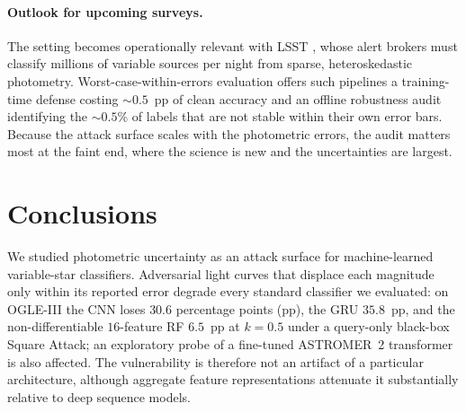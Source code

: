 \documentclass{aa}
\begin{document}
\paragraph{Outlook for upcoming surveys.}
The setting becomes operationally relevant with LSST \citep{ivezic2019lsst}, whose alert brokers must classify millions of
variable sources per night from sparse, heteroskedastic photometry.
Worst-case-within-errors evaluation offers such pipelines a training-time
defense costing ${\sim}0.5$~pp of clean accuracy and an offline robustness
audit identifying the ${\sim}0.5\%$ of labels that are not stable within
their own error bars. Because the attack surface scales with the
photometric errors, the audit matters most at the faint end, where the
science is new and the uncertainties are largest.

\section{Conclusions} \label{conclusion}

We studied photometric uncertainty as an attack surface for
machine-learned variable-star classifiers. Adversarial light curves that
displace each magnitude only within its reported error degrade every
standard classifier we evaluated: on OGLE-III the CNN loses $30.6$
percentage points (pp), the GRU $35.8$~pp, and the non-differentiable
$16$-feature RF $6.5$~pp at $k=0.5$ under a query-only black-box Square
Attack; an exploratory probe of a fine-tuned ASTROMER~2 transformer is also
affected. The vulnerability is therefore not an artifact of a particular
architecture, although aggregate feature representations attenuate it
substantially relative to deep sequence models.
\end{document}
